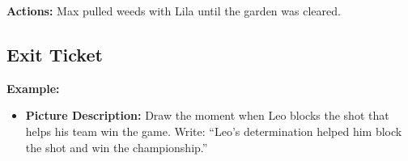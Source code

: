 \documentclass[12pt]{article}
\begin{document}
\textbf{Actions:} Max pulled weeds with Lila until the garden was cleared.

\vspace{1em}

\subsection*{Exit Ticket}

\textbf{Example:}
\begin{itemize}
    \item \textbf{Picture Description:} Draw the moment when Leo blocks the shot that helps his team win the game. Write: “Leo’s determination helped him block the shot and win the championship.”
\end{itemize}
\end{document}
